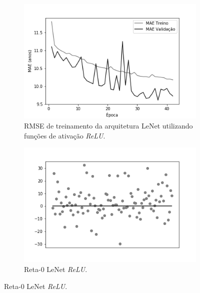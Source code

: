 
	\begin{figure}[hb!]
		\caption{Resultados do treinamento e teste da CNN LeNet.}\label{fig:lenet-abordagem1}
		\begin{subfigure}[hb]{0.5\linewidth}
			\caption{RMSE de treinamento da arquitetura LeNet utilizando funções de ativação \emph{ReLU}.}
			\label{fig:redeneuralbiologica}
			\includegraphics[width=\linewidth]{img/graficos/history/lenet/fig-history-abordagem-4-lenet-relu-mae.png}%
		\end{subfigure}%
		\begin{subfigure}[hb]{0.5\linewidth}
			\caption{Reta-0 LeNet \emph{ReLU}.}
			\label{fig:redeneuralbiologica}
			\includegraphics[width=\linewidth]{img/graficos/reta0/lenet/fig-reta-0-abordagem-4-lenet-relu.png}%

\end{subfigure}
\end{figure}

